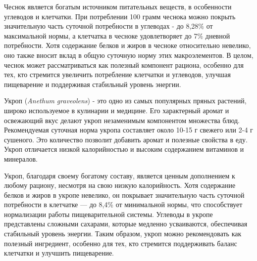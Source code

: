
\begin{multicols}{2}
Чеснок является богатым источником питательных веществ, в особенности
углеводов и клетчатки. При потреблении 100 грамм чеснока можно покрыть
значительную часть суточной потребности в углеводах - до 8,28\% от
максимальной нормы, а клетчатка в чесноке удовлетворяет до 7\% дневной
потребности. Хотя содержание белков и жиров в чесноке относительно
невелико, оно также вносит вклад в общую суточную норму этих
макроэлементов. В целом, чеснок может рассматриваться как полезный
компонент рациона, особенно для тех, кто стремится увеличить потребление
клетчатки и углеводов, улучшая пищеварение и поддерживая стабильный
уровень энергии.

Укроп (\emph{Anethum graveolens}) - это одно из самых популярных пряных
растений, широко используемое в кулинарии и медицине. Его характерный
аромат и освежающий вкус делают укроп незаменимым компонентом множества
блюд. Рекомендуемая суточная норма укропа составляет около 10-15 г
свежего или 2-4 г сушеного. Это количество позволит добавить аромат и
полезные свойства в еду. Укроп отличается низкой калорийностью и высоким
содержанием витаминов и минералов.

Укроп, благодаря своему богатому составу, является ценным дополнением к
любому рациону, несмотря на свою низкую калорийность. Хотя содержание
белков и жиров в укропе невелико, он покрывает значительную часть
суточной потребности в клетчатке --- до 8,4\% от минимальной нормы, что
способствует нормализации работы пищеварительной системы. Углеводы в
укропе представлены сложными сахарами, которые медленно усваиваются,
обеспечивая стабильный уровень энергии. Таким образом, укроп можно
рекомендовать как полезный ингредиент, особенно для тех, кто стремится
поддерживать баланс клетчатки и улучшить пищеварение.


\end{multicols}

